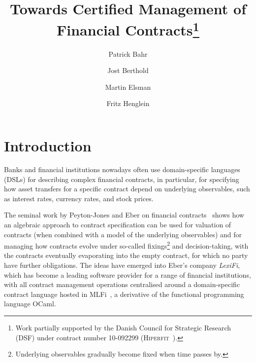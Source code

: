 \documentclass[a4paper,debug,twocolumn]{easychair}
\theoremstyle{plain}
\begin{document}
\title{Towards Certified Management of Financial Contracts\thanks{Work
    partially supported by the Danish Council for Strategic Research
    (DSF) under contract number 10-092299 (\textsc{Hiperfit}~\cite{TFP11Hiperfit}).}}


\author{Patrick Bahr
    \and
        Jost Berthold 
    \and 
        Martin Elsman 
    \and 
        Fritz Henglein\\
}



\clearpage
\maketitle

\section{Introduction}

Banks and financial institutions nowadays often use domain-specific
languages (DSLs) for describing complex financial contracts, in
particular, for specifying how asset transfers for a specific contract
depend on underlying observables, such as interest rates, currency
rates, and stock prices.

The seminal work by Peyton-Jones and Eber on financial
contracts~\cite{SPJ2000} shows how an algebraic approach to contract
specification can be used for valuation of contracts (when combined
with a model of the underlying observables) and for managing how
contracts evolve under so-called fixings\footnote{Underlying
  observables gradually become fixed when time passes by.} and
decision-taking, with the contracts eventually evaporating into the
empty contract, for which no party have further obligations. The ideas
have emerged into Eber's company \emph{LexiFi}, which has become a
leading software provider for a range of financial institutions, with
all contract management operations centralised around a
domain-specific contract language hosted in MLFi~\cite{MLFi}, a
derivative of the functional programming language OCaml.
\end{document}
